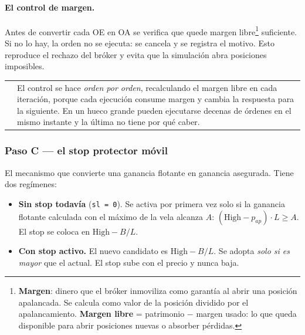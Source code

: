 \documentclass[11pt,a4paper]{article}
\makeatletter
\newcommand{\code}[1]{\texttt{\small #1}}
\newenvironment{nota}{%
  \par\medskip\noindent
  \begin{tabular}{@{}p{0.4em}@{\hspace{8pt}}p{\dimexpr\linewidth-2em\relax}@{}}
  \textcolor{cnaranja}{\rule{3pt}{1.1em}} &
}{\end{tabular}\par\medskip}
\makeatother
\begin{document}
\paragraph{El control de margen.} Antes de convertir cada OE en OA se verifica que quede
margen libre\footnote{\textbf{Margen}: dinero que el bróker inmoviliza como garantía al
abrir una posición apalancada. Se calcula como valor de la posición dividido por el
apalancamiento. \textbf{Margen libre} = patrimonio $-$ margen usado: lo que queda disponible
para abrir posiciones nuevas o absorber pérdidas.} suficiente. Si no lo hay, la orden no se
ejecuta: se cancela y se registra el motivo. Esto reproduce el rechazo del bróker y evita
que la simulación abra posiciones imposibles.

\begin{nota}
El control se hace \textit{orden por orden}, recalculando el margen libre en cada
iteración, porque cada ejecución consume margen y cambia la respuesta para la siguiente.
En un hueco grande pueden ejecutarse decenas de órdenes en el mismo instante y la última no
tiene por qué caber.
\end{nota}

\subsubsection{Paso C — el stop protector móvil}

El mecanismo que convierte una ganancia flotante en ganancia asegurada. Tiene dos
regímenes:

\begin{itemize}[leftmargin=1.4em,itemsep=2pt]
\item \textbf{Sin stop todavía} (\code{sl = 0}). Se activa por primera vez solo si la
ganancia flotante calculada con el máximo de la vela alcanza $A$:
$(\text{High} - p_{ap}) \cdot L \ge A$. El stop se coloca en $\text{High} - B/L$.
\item \textbf{Con stop activo.} El nuevo candidato es $\text{High} - B/L$. Se adopta
\textit{solo si es mayor} que el actual. El stop sube con el precio y nunca baja.
\end{itemize}
\end{document}
